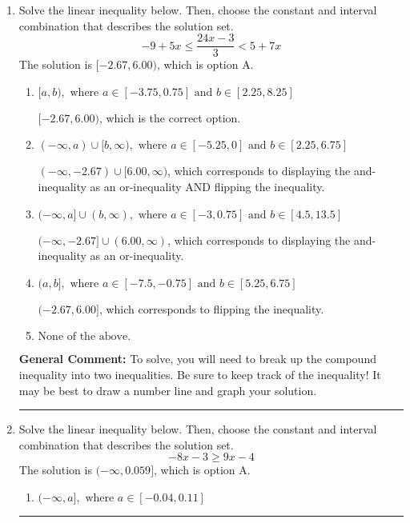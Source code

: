 \documentclass{extbook}[14pt]
\newcommand{\litem}[1]{\item #1

\rule{\textwidth}{0.4pt}}
\begin{document}
\begin{enumerate}
{\begin{enumerate}[label=\Alph*.]
This describes the values more than 6 from 3
\item \( (-\infty, -3] \cup [9, \infty) \)

This describes the values no less than 6 from 3
\item \( (-3, 9) \)

This describes the values less than 6 from 3
\item \( [-3, 9] \)

This describes the values no more than 6 from 3
\item \( \text{None of the above} \)

You likely thought the values in the interval were not correct.
\end{enumerate}

\textbf{General Comment:} When thinking about this language, it helps to draw a number line and try points.
}
\litem{
Solve the linear inequality below. Then, choose the constant and interval combination that describes the solution set.
\[ -9 + 5 x \leq \frac{24 x - 3}{3} < 5 + 7 x \]The solution is \( [-2.67, 6.00) \), which is option A.\begin{enumerate}[label=\Alph*.]
\item \( [a, b), \text{ where } a \in [-3.75, 0.75] \text{ and } b \in [2.25, 8.25] \)

$[-2.67, 6.00)$, which is the correct option.
\item \( (-\infty, a) \cup [b, \infty), \text{ where } a \in [-5.25, 0] \text{ and } b \in [2.25, 6.75] \)

$(-\infty, -2.67) \cup [6.00, \infty)$, which corresponds to displaying the and-inequality as an or-inequality AND flipping the inequality.
\item \( (-\infty, a] \cup (b, \infty), \text{ where } a \in [-3, 0.75] \text{ and } b \in [4.5, 13.5] \)

$(-\infty, -2.67] \cup (6.00, \infty)$, which corresponds to displaying the and-inequality as an or-inequality.
\item \( (a, b], \text{ where } a \in [-7.5, -0.75] \text{ and } b \in [5.25, 6.75] \)

$(-2.67, 6.00]$, which corresponds to flipping the inequality.
\item \( \text{None of the above.} \)


\end{enumerate}

\textbf{General Comment:} To solve, you will need to break up the compound inequality into two inequalities. Be sure to keep track of the inequality! It may be best to draw a number line and graph your solution.
}
\litem{
Solve the linear inequality below. Then, choose the constant and interval combination that describes the solution set.
\[ -8x -3 \geq 9x -4 \]The solution is \( (-\infty, 0.059] \), which is option A.\begin{enumerate}[label=\Alph*.]
\item \( (-\infty, a], \text{ where } a \in [-0.04, 0.11] \)


\end{enumerate}}
\end{enumerate}
\end{document}
